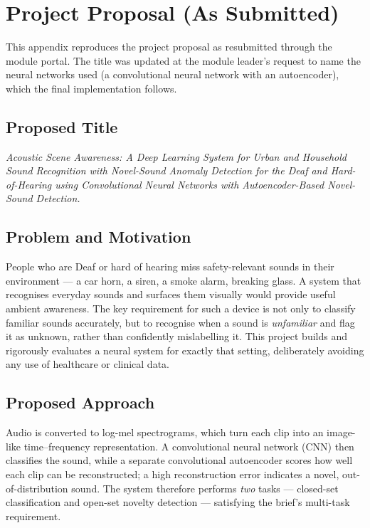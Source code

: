 \documentclass[11pt, a4paper]{article}
\begin{document}
\section{Project Proposal (As Submitted)}
\label{app:proposal}

This appendix reproduces the project proposal as resubmitted through the module portal. The title was updated at the module leader's request to name the neural networks used (a convolutional neural network with an autoencoder), which the final implementation follows.

\subsection*{Proposed Title}
\textit{Acoustic Scene Awareness: A Deep Learning System for Urban and Household Sound Recognition with Novel-Sound Anomaly Detection for the Deaf and Hard-of-Hearing using Convolutional Neural Networks with Autoencoder-Based Novel-Sound Detection.}

\subsection*{Problem and Motivation}
People who are Deaf or hard of hearing miss safety-relevant sounds in their environment --- a car horn, a siren, a smoke alarm, breaking glass. A system that recognises everyday sounds and surfaces them visually would provide useful ambient awareness. The key requirement for such a device is not only to classify familiar sounds accurately, but to recognise when a sound is \emph{unfamiliar} and flag it as unknown, rather than confidently mislabelling it. This project builds and rigorously evaluates a neural system for exactly that setting, deliberately avoiding any use of healthcare or clinical data.

\subsection*{Proposed Approach}
Audio is converted to log-mel spectrograms, which turn each clip into an image-like time--frequency representation. A convolutional neural network (CNN) then classifies the sound, while a separate convolutional autoencoder scores how well each clip can be reconstructed; a high reconstruction error indicates a novel, out-of-distribution sound. The system therefore performs \emph{two} tasks --- closed-set classification and open-set novelty detection --- satisfying the brief's multi-task requirement.
\end{document}
